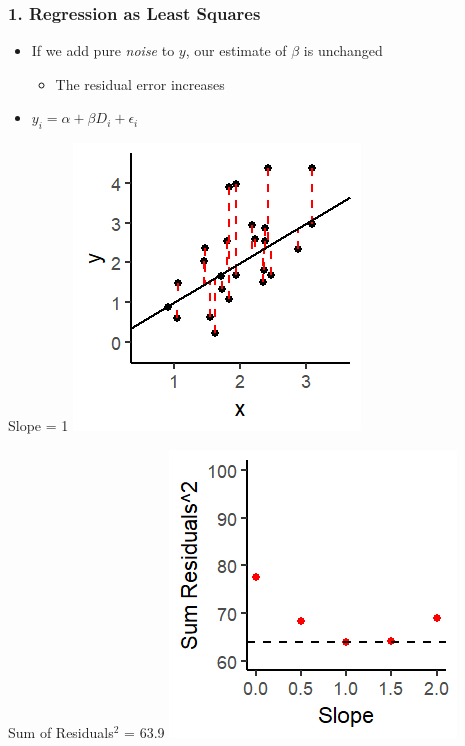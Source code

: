 \documentclass[xcolor=x11names,compress]{beamer}\usepackage[]{graphicx}\usepackage[]{color}
\makeatletter
\def\maxwidth{ %
  \ifdim\Gin@nat@width>\linewidth
    \linewidth
  \else
    \Gin@nat@width
  \fi
}
\newenvironment{knitrout}{}{} %
\renewcommand{\(}{\begin{columns}}
\renewcommand{\)}{\end{columns}}
\newcommand{\<}[1]{\begin{column}{#1}}
\renewcommand{\>}{\end{column}}
\makeatother
\begin{document}
\begin{frame}
\frametitle{1. Regression as Least Squares}
\begin{itemize}
\item If we add pure \textit{noise} to $y$, our estimate of $\beta$ is unchanged
\pause
\begin{itemize}
\item The residual error increases
\end{itemize}
\item $y_i = \alpha + \beta D_i + \epsilon_i$
\end{itemize}
\begin{multicols}{2}
Slope = 1
\begin{knitrout}
\color{fgcolor}
\includegraphics[width=\maxwidth]{figure/graph_ols7-1} 

\end{knitrout}
\columnbreak
\pause
Sum of Residuals$^2$ = 63.9
\begin{knitrout}
\color{fgcolor}
\includegraphics[width=\maxwidth]{figure/graph_ssr7-1} 

\end{knitrout}
\end{multicols}
\end{frame}
\end{document}
